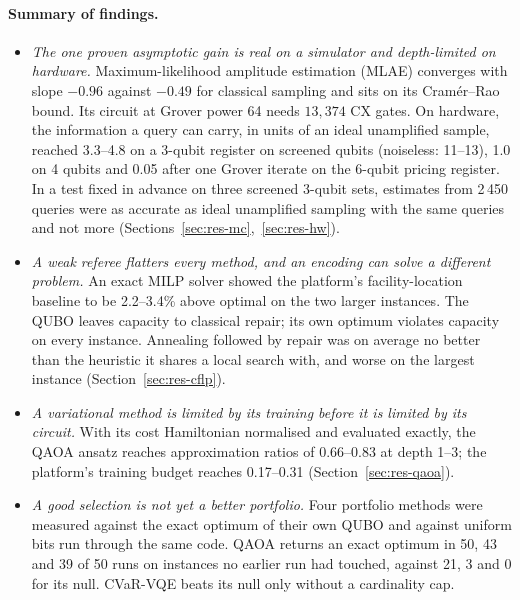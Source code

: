 \documentclass[11pt,a4paper]{article}
\begin{document}
\paragraph{Summary of findings.}
\begin{itemize}
  \item \emph{The one proven asymptotic gain is real on a simulator and
        depth-limited on hardware.} Maximum-likelihood amplitude estimation
        (MLAE) converges with slope $-0.96$ against $-0.49$ for classical
        sampling and sits on its Cram\'er--Rao bound. Its circuit at Grover
        power 64 needs $13{,}374$ CX gates. On hardware, the information a
        query can carry, in units of an ideal unamplified sample, reached
        3.3--4.8 on a 3-qubit register on screened qubits (noiseless:
        11--13), 1.0 on 4 qubits and 0.05 after one Grover iterate on the
        6-qubit pricing register. In a test fixed in advance on three
        screened 3-qubit sets, estimates from 2\,450 queries were as
        accurate as ideal unamplified sampling with the same queries and
        not more
        (Sections~\ref{sec:res-mc},~\ref{sec:res-hw}).
  \item \emph{A weak referee flatters every method, and an encoding can solve
        a different problem.} An exact MILP solver showed the platform's
        facility-location baseline to be 2.2--3.4\% above optimal on the two
        larger instances. The QUBO
        leaves capacity to classical repair; its own optimum violates
        capacity on every instance. Annealing followed by repair was on
        average no better than the heuristic it shares a local search with,
        and worse on the largest instance
        (Section~\ref{sec:res-cflp}).
  \item \emph{A variational method is limited by its training before it is
        limited by its circuit.} With its cost Hamiltonian normalised and
        evaluated exactly, the QAOA ansatz reaches
        approximation ratios of 0.66--0.83 at depth 1--3; the platform's
        training budget reaches 0.17--0.31 (Section~\ref{sec:res-qaoa}).
  \item \emph{A good selection is not yet a better portfolio.} Four
        portfolio methods were measured against the exact optimum of their
        own QUBO and against uniform bits run through the same code. QAOA
        returns an exact optimum in 50, 43 and 39 of 50 runs on
        instances no earlier run had touched, against 21, 3 and 0 for its
        null. CVaR-VQE beats its null only without a cardinality cap.

\end{itemize}
\end{document}
